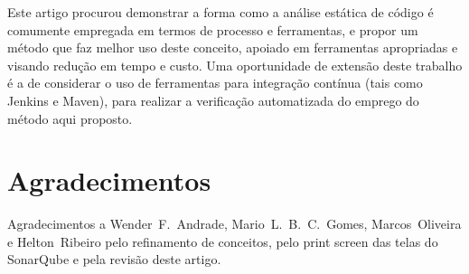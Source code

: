 \documentclass[12pt,journal,compsoc]{IEEEtran}
\begin{document}
Este artigo procurou demonstrar a forma como a análise estática de código é comumente empregada em termos de processo e ferramentas, e propor um método que faz melhor uso deste conceito, apoiado em  ferramentas apropriadas e visando redução em tempo e custo. Uma oportunidade de extensão deste trabalho é a de considerar o uso de ferramentas para integração contínua (tais como Jenkins\cite{jenkins} e Maven\cite{maven}), para realizar a verificação automatizada do emprego do método aqui proposto.

\section*{Agradecimentos}

Agradecimentos a Wender~F.~Andrade, Mario~L.~B.~C.~Gomes, Marcos~Oliveira e Helton~Ribeiro pelo refinamento de conceitos, pelo print screen das telas do SonarQube e pela revisão deste artigo.




\end{document}
